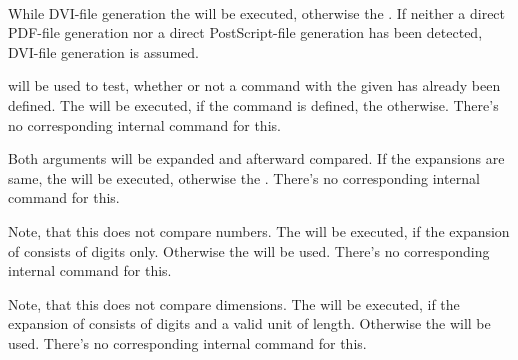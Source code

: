 \begin{Declaration}
  \\
\end{Declaration}
%
%
While DVI-file generation the  will be executed,
otherwise the . If neither a direct PDF-file
generation nor a direct PostScript-file generation has been detected, DVI-file
generation is assumed.
%
%
%


\begin{Declaration}
\end{Declaration}
%
\eTeX{} will be used to test, whether or not a command with the given
 has already been defined. The  will be
executed, if the command is defined, the 
otherwise. There's no corresponding internal command for this.
%
%


\begin{Declaration}
\end{Declaration}
%
Both  arguments will be expanded and afterward compared. If the
expansions are same, the  will be
executed, otherwise the . There's no corresponding
internal command for this.
%
%


\begin{Declaration}
\end{Declaration}
%
Note, that this does not compare numbers.  The  will
be executed, if the expansion of  consists of digits
only. Otherwise the  will be used. There's no
corresponding internal command for this.
%
%


\begin{Declaration}
\end{Declaration}
%
Note, that this does not compare dimensions. The  will
be executed, if the expansion of  consists of digits and a valid
unit of length. Otherwise the  will be used. There's no
corresponding internal command for this.
%
%


